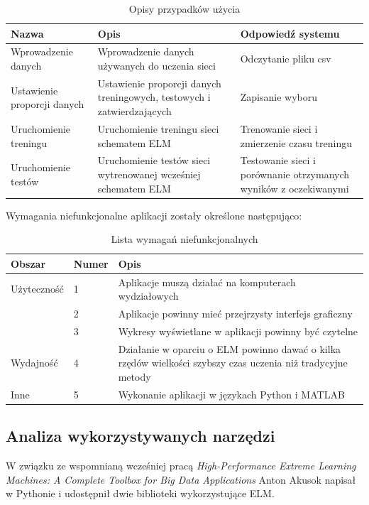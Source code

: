 \documentclass{article}
\begin{document}
\begin{table}[H]
\caption{Opisy przypadków użycia}
\begin{tabular}{|p{3.4cm}|p{5cm}|p{4cm}|}
\hline
\textbf{Nazwa} & \textbf{Opis} & \textbf{Odpowiedź systemu} \\
\hline
Wprowadzenie danych & Wprowadzenie danych używanych do uczenia sieci & Odczytanie pliku csv \\ \hline
Ustawienie proporcji danych & Ustawienie proporcji danych treningowych, testowych i zatwierdzających & Zapisanie wyboru \\ \hline
Uruchomienie treningu & Uruchomienie treningu sieci schematem ELM & Trenowanie sieci i zmierzenie czasu treningu \\ \hline
Uruchomienie testów & Uruchomienie testów sieci wytrenowanej wcześniej schematem ELM & Testowanie sieci i porównanie otrzymanych wyników z oczekiwanymi \\
\hline
\end{tabular}
\end{table}

Wymagania niefunkcjonalne aplikacji zostały określone następująco:
\begin{table}[H]
\caption{Lista wymagań niefunkcjonalnych}
\begin{tabular}{|l|l|p{9.4cm}|}
\hline
\textbf{Obszar} & \textbf{Numer} & \textbf{Opis} \\
\hline
Użyteczność & 1 & Aplikacje muszą działać na komputerach wydziałowych \\
 & 2 & Aplikacje powinny mieć przejrzysty interfejs graficzny \\
 & 3 & Wykresy wyświetlane w aplikacji powinny być czytelne \\
\hline
Wydajność & 4 & Działanie w oparciu o ELM powinno dawać o kilka rzędów wielkości szybszy czas uczenia niż tradycyjne metody \\
\hline 
Inne & 5 & Wykonanie aplikacji w językach Python i MATLAB \\
\hline
\end{tabular}
\end{table}
\subsection{Analiza wykorzystywanych narzędzi}
W związku ze wspomnianą wcześniej pracą \textit{High-Performance Extreme Learning Machines: A Complete Toolbox for Big Data Applications} Anton Akusok napisał w Pythonie i udostępnił dwie biblioteki wykorzystujące ELM.
\end{document}
